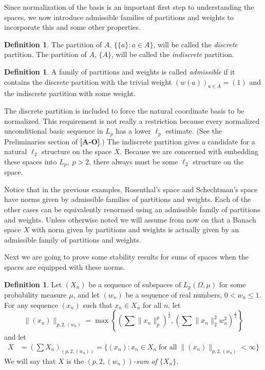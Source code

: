 \documentclass[12pt]{amsart}
\theoremstyle{definition}
\newtheorem{definition}[theorem]{Definition}
\theoremstyle{remark}
\numberwithin{equation}{section}
\begin{document}
Since normalization of the basis is an important first step
to understanding the spaces, we now 
introduce admissible families of partitions and weights to incorporate
this and some other properties.

\begin{definition}
The partition of $A$, $\{ \{a\}: a\in A\}$, will be called the {\it
discrete}
 partition. The partition of $A$, $\{ A\}$,
 will be called the {\it indiscrete} partition. 
\end{definition}

\begin{definition}
A family of partitions and weights is called {\it admissible} if it contains
the discrete partition with the trivial weight $(w(a))_{a\in A}=(1)$ and
the indiscrete partition with some weight.
\end{definition}

The discrete partition is included to force the natural coordinate
basis to be normalized. This requirement is not really a restriction
because every normalized unconditional basic sequence in $L_p$
has a lower $\ell_p$ estimate. (See the Preliminaries section of {\bf [A-O]}.)
The indiscrete partition gives a candidate
for a natural $\ell_2$ structure on the space $X$. Because we are
concerned with embedding these spaces into $L_p, \; p>2$, 
there always must be some $\ell_2$ structure on the space.

Notice that in the previous examples, Rosenthal's space and
Schechtman's space have norms given by admissible families 
of partitions and weights. Each of the other cases can be 
equivalently renormed using an admissible family of partitions 
and weights. Unless otherwise noted we will assume from now on
that a Banach space $X$ with norm given by partitions and weights
is actually given by an admissible family of partitions and weights.

Next we are going to prove some stability results
for sums of spaces when the spaces are equipped with these norms.

\begin{definition}\label{(p,2)-sum}
Let $(X_n)$ be a sequence of subspaces of 
$L_p(\Omega, \mu)$ for some 
probability measure $\mu$, and let $(w_n)$ be a sequence of real
numbers, $0< w_n \le 1$. For any sequence $(x_n)$ such that $x_n \in
X_n$ for all $n$, let
$$\|(x_n)\|_{p,2,(w_n)}=\max \left\{\left(\sum
\|x_n\|_{p}^{p}\right)^{\frac 1 p}, \left(\sum \|x_n\|_{2}^{2} 
w_{n}^{2}\right)^{\frac 1 2}\right \}$$
and let
\begin{align*}
X&=\left(\sum X_n\right)_{(p,2,(w_n))}
=\{(x_n): x_n \in X_n
\;\text{for}\;\text{all}\;\|(x_n)\|_{p,2,(w_n)}<\infty\}
\end{align*}
We will say that $X$ is the {\it $(p,2,(w_n))$-sum of $\{X_n\}$.}
\end{definition} 
\end{document}
